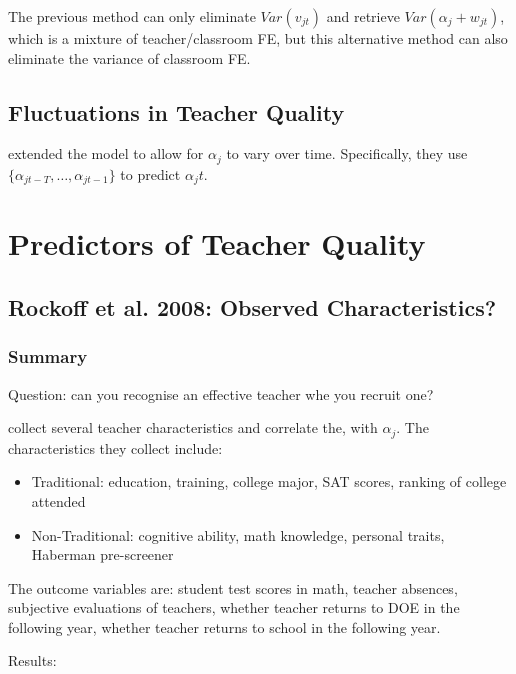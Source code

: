         The previous method can only eliminate $Var(v_{jt})$ and retrieve $Var(\alpha_j + w_{jt})$, which is a mixture of teacher/classroom FE, but this alternative method can also eliminate the variance of classroom FE.
        
    \subsection{Fluctuations in Teacher Quality}

        \cite{chetty_measuring_2014} extended the model to allow for $\alpha_j$ to vary over time. Specifically, they use $\{ \alpha_{jt-T},\dots,\alpha_{jt-1} \}$ to predict $\alpha_jt$.

\section{Predictors of Teacher Quality}

    \subsection{Rockoff et al. 2008: Observed Characteristics?}

        \subsubsection{Summary}

            Question: can you recognise an effective teacher whe you recruit one?
    
            \cite{rockoff_can_2011} collect several teacher characteristics and correlate the, with $\alpha_j$. The characteristics they collect include:
            \begin{itemize}
                \item Traditional: education, training, college major, SAT scores, ranking of college attended
                \item Non-Traditional: cognitive ability, math knowledge, personal traits, Haberman pre-screener
            \end{itemize}
            The outcome variables are: student test scores in math, teacher absences, subjective evaluations of teachers, whether teacher returns to DOE in the following year, whether  teacher returns to school in the following year.
    
            Results: 

